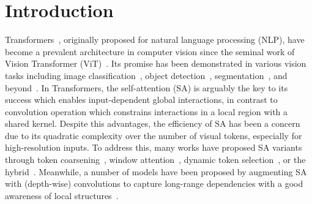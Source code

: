 \documentclass{article}
\begin{document}
\section{Introduction}
\label{Sec:intro}
Transformers~\cite{vaswani2017attention}, originally proposed for natural language processing (NLP), have become a prevalent architecture in computer vision since the seminal work of Vision Transformer (ViT)~\cite{dosovitskiy2020image}. Its promise has been demonstrated in various vision tasks including image classification~\cite{touvron2020training,wang2021pyramid,wu2021cvt,liu2021swin,zhang2021multi,vaswani2021scaling}, object detection~\cite{carion2020end,zhu2020deformable,zheng2020end,dai2020up}, segmentation~\cite{wang2020max,wang2020end,cheng2021per}, and beyond~\cite{li2021trear,zhao2021tuber,chang2021augmented,chen2021Transformer,wang2021Transformer,li2021sctn}. In Transformers, the self-attention (SA) is arguably the key to its success which enables input-dependent global interactions, in contrast to convolution operation which constrains interactions in a local region with a shared kernel. Despite this advantages, the efficiency of SA has been a concern due to its quadratic complexity over the number of visual tokens, especially for high-resolution inputs. To address this, many works have proposed SA variants through token coarsening~\cite{wang2021pyramid}, window attention~\cite{liu2021swin,vaswani2021scaling,zhang2021multi}, dynamic token selection~\cite{rao2021dynamicvit, yin2022vit, meng2022adavit}, or the hybrid~\cite{yang2021focal,chu2021twins}. Meanwhile, a number of models have been proposed by augmenting SA with (depth-wise) convolutions to capture long-range dependencies with a good awareness of local structures~\cite{wu2021cvt,guo2021cmt,xu2021co,gao2021container,dong2021cswin,lee2022mpvit,chen2022mixformer, ding2022davit}. 
\end{document}
